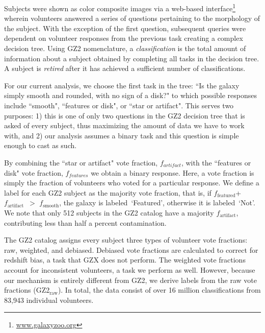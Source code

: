 \documentclass[twocolumn]{aastex6}
\newcommand{\feat}{`Featured'}
\newcommand{\notfeat}{`Not'}
\newcommand{\raw}{GZ2$_{\text{raw}}$}
\newcommand{\ffeat}{$f_{\mathrm{featured}}$}
\newcommand{\fsmooth}{$f_{\mathrm{smooth}}$}
\newcommand{\fstar}{$f_{\mathrm{artifact}}$}
\begin{document}
Subjects were shown as color composite images via a web-based interface\footnote{\url{www.galaxyzoo.org}} wherein 
volunteers answered a series of questions pertaining to the morphology of the subject.
With the exception of the first question, subsequent queries were 
dependent on volunteer responses from the previous task creating a complex decision tree. 
Using GZ2 nomenclature,  a \textit{classification} is the total amount of
information about a subject obtained by completing all tasks in the decision tree. 
A subject is \textit{retired} after it has achieved a sufficient number of classifications.


For our current analysis, we choose the first task in the tree: 
``Is the galaxy simply smooth and rounded, with no sign of a disk?" to which possible 
responses include ``smooth", ``features or disk", or ``star or artifact". 
This serves two purposes: 1) this is one of only two questions in the GZ2
decision tree that is asked of every subject, thus maximizing the amount of data
we have to work with, and 2) our analysis assumes a binary task and this question is 
simple enough to cast as such. 

By combining the ``star or artifact" vote fraction, $f_{artifact}$, 
with the ``features or disk" vote fraction, $f_{features}$ we obtain a binary response.
Here, a vote fraction is simply the fraction of volunteers who voted for a
particular response.  
We define a label for each GZ2 subject as the majority vote fraction, that is,
if \ffeat+\fstar~$ >$ \fsmooth, the galaxy is labeled~\feat, otherwise
it is labeled~\notfeat. 
We note that only 512 subjects in the GZ2 catalog have a majority \fstar, 
contributing less than half a percent contamination.

The GZ2 catalog assigns every subject three types of volunteer vote fractions: 
raw, weighted, and debiased. 
Debiased vote fractions are calculated to correct for redshift bias, a task that 
GZX does not perform. 
The weighted vote fractions account for inconsistent volunteers, 
a task we perform as well. However, because our mechanism is entirely different 
from GZ2, we derive labels from the raw vote fractions (\raw).
 In total, the data consist of over 16 million classifications from 83,943 individual volunteers. 


\end{document}
